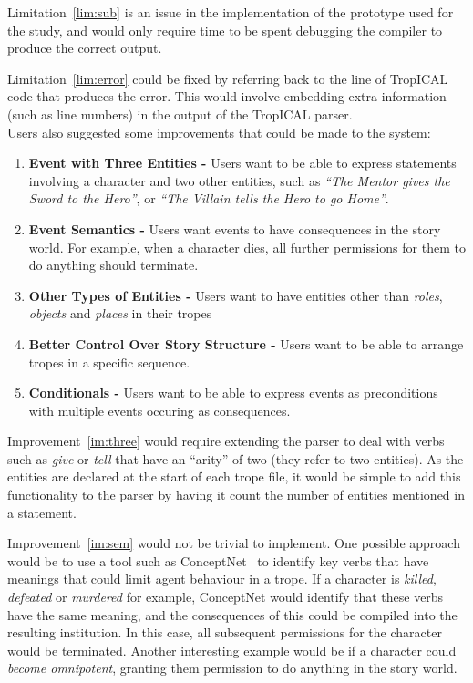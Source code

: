 \documentclass[11pt]{report}
\begin{document}
Limitation~\ref{lim:sub} is an issue in the implementation of the prototype
used for the study, and would only require time to be spent debugging the
compiler to produce the correct output.

Limitation~\ref{lim:error} could be fixed by referring back to the line of
TropICAL code that produces the error. This would involve embedding extra
information (such as line numbers) in the output of the TropICAL parser.\\

Users also suggested some improvements that could be made to the system:

\begin{enumerate}[{Improvement} 1:]
  \item\label{im:three} \textbf{Event with Three Entities -} Users want to be
    able to express statements involving a character and two other entities,
    such as \emph{``The Mentor gives the Sword to the Hero''}, or \emph{``The
      Villain tells the Hero to go Home''}.
  \item\label{im:sem} \textbf{Event Semantics -} Users want events to have
    consequences in the story world. For example, when a character dies, all
    further permissions for them to do anything should terminate.
  \item\label{im:ent} \textbf{Other Types of Entities -} Users want to have
    entities other than \emph{roles}, \emph{objects} and \emph{places} in their tropes
  \item\label{im:struc} \textbf{Better Control Over Story Structure -} Users want
    to be able to arrange tropes in a specific sequence.
  \item\label{im:cond} \textbf{Conditionals -} Users want to be able to express
    events as preconditions with multiple events occuring as consequences.
\end{enumerate}

Improvement~\ref{im:three} would require extending the parser to deal with
verbs such as \emph{give} or \emph{tell} that have an ``arity'' of two (they
refer to two entities). As the entities are declared at the start of each trope file, it
would be simple to add this functionality to the parser by having it count the
number of entities mentioned in a statement.

Improvement~\ref{im:sem} would not be trivial to implement. One possible
approach would be to use a tool such as ConceptNet~\citep{liu2004conceptnet} to
identify key verbs that have meanings that could limit agent behaviour in a
trope. If a character is \emph{killed}, \emph{defeated} or \emph{murdered} for
example, ConceptNet would identify that these verbs have the same meaning, and
the consequences of this could be compiled into the resulting institution. In
this case, all subsequent permissions for the character would be terminated.
Another interesting example would be if a character could \emph{become
  omnipotent}, granting them permission to do anything in the story world.
\end{document}
